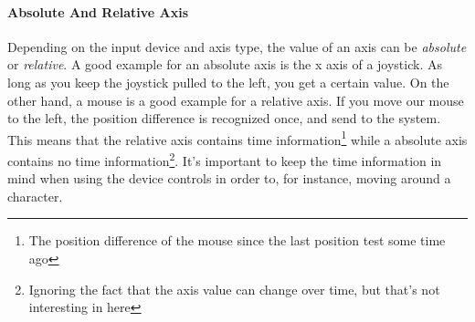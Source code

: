 \paragraph{Absolute And Relative Axis}
Depending on the input device and axis type, the value of an axis can be \emph{absolute} or \emph{relative}. A good example for an absolute axis is the x axis of a joystick. As long as you keep the joystick pulled to the left, you get a certain value. On the other hand, a mouse is a good example for a relative axis. If you move our mouse to the left, the position difference is recognized once, and send to the system. This means that the relative axis contains time information\footnote{The position difference of the mouse since the last position test some time ago} while a absolute axis contains no time information\footnote{Ignoring the fact that the axis value can change over time, but that's not interesting in here}. It's important to keep the time information in mind when using the device controls in order to, for instance, moving around a character.
